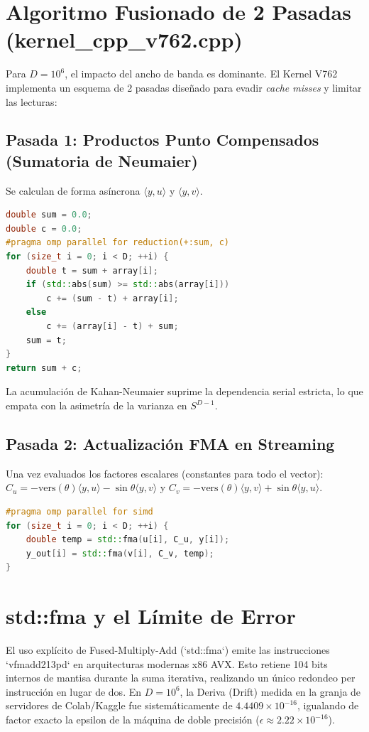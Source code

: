 \section{Algoritmo Fusionado de 2 Pasadas (kernel\_cpp\_v762.cpp)}
Para $D=10^6$, el impacto del ancho de banda es dominante. El Kernel V762 implementa un esquema de 2 pasadas diseñado para evadir \textit{cache misses} y limitar las lecturas:

\subsection{Pasada 1: Productos Punto Compensados (Sumatoria de Neumaier)}
Se calculan de forma asíncrona $\langle y, u \rangle$ y $\langle y, v \rangle$.
\begin{lstlisting}[language=C++, caption={Acumulador de Neumaier}]
double sum = 0.0;
double c = 0.0;
#pragma omp parallel for reduction(+:sum, c)
for (size_t i = 0; i < D; ++i) {
    double t = sum + array[i];
    if (std::abs(sum) >= std::abs(array[i]))
        c += (sum - t) + array[i];
    else
        c += (array[i] - t) + sum;
    sum = t;
}
return sum + c;
\end{lstlisting}
La acumulación de Kahan-Neumaier suprime la dependencia serial estricta, lo que empata con la asimetría de la varianza en $S^{D-1}$.

\subsection{Pasada 2: Actualización FMA en Streaming}
Una vez evaluados los factores escalares (constantes para todo el vector):
$C_u = -\text{vers}(\theta) \langle y, u \rangle - \sin\theta \langle y, v \rangle$ y
$C_v = -\text{vers}(\theta) \langle y, v \rangle + \sin\theta \langle y, u \rangle$.
\begin{lstlisting}[language=C++, caption={Streaming FMA Loop}]
#pragma omp parallel for simd
for (size_t i = 0; i < D; ++i) {
    double temp = std::fma(u[i], C_u, y[i]);
    y_out[i] = std::fma(v[i], C_v, temp);
}
\end{lstlisting}

\section{std::fma y el Límite de Error}
El uso explícito de Fused-Multiply-Add (`std::fma`) emite las instrucciones `vfmadd213pd` en arquitecturas modernas x86 AVX. Esto retiene 104 bits internos de mantisa durante la suma iterativa, realizando un único redondeo per instrucción en lugar de dos. En $D=10^6$, la Deriva (Drift) medida en la granja de servidores de Colab/Kaggle fue sistemáticamente de $4.4409 \times 10^{-16}$, igualando de factor exacto la epsilon de la máquina de doble precisión ($\epsilon \approx 2.22 \times 10^{-16}$).

